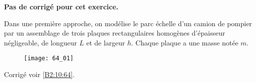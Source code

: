 \normaltrue \difficilefalse \tdifficilefalse
\correctionfalse


\setcounter{numques}{0}
\ifcorrection
\else
\textbf{Pas de corrigé pour cet exercice.}
\fi



\ifprof
\else
Dans une première approche, on modélise le parc échelle d'un camion de pompier par un assemblage de trois plaques
rectangulaires homogènes d’épaisseur négligeable, de longueur $L$ et de largeur $h$. Chaque plaque a une masse notée $m$.


\begin{figure}[H]
\centering
\texttt{[image: 64\_01]}
\end{figure}
\fi

\ifprof
\else
\fi



\ifprof
\else
\begin{flushright}
\footnotesize{Corrigé voir \ref{B2:10:64}.}
\end{flushright}%
\fi